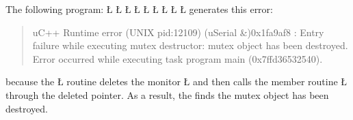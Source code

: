 \documentclass[openright,twoside]{report}
\begin{document}
The following program:
\LGinlinefalse\LGbegin\lgrinde
\L{}
\L{}
\L{\LB{}}
\L{\LB{\};}}
\L{}
\L{\LB{}}
\L{\LB{}}
\CE{}\L{\LB{}}
\CE{}\L{\LB{\}}}
\endlgrinde\LGend
generates this error:
\begin{quote}
\BGfont
uC++ Runtime error (UNIX pid:12109) (uSerial \&)0x1fa9af8 : Entry failure while executing mutex destructor: mutex object has been destroyed.
Error occurred while executing task program main (0x7ffd36532540).
\end{quote}
because the \LGinlinetrue\LGbegin\lgrinde\L{}\endlgrinde\LGend{} routine deletes the monitor \LGinlinetrue\LGbegin\lgrinde\L{}\endlgrinde\LGend{} and then calls the member routine \LGinlinetrue\LGbegin\lgrinde\L{}\endlgrinde\LGend{} through the deleted pointer.
As a result, the  finds the mutex object has been destroyed.
\end{document}
